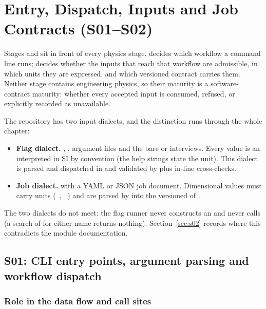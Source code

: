 \chapter{Entry, Dispatch, Inputs and Job Contracts (S01--S02)}\label{ch:s01-s02}

Stages  and  sit in front of every physics stage.  decides which workflow a command line runs;  decides whether the inputs that reach that workflow are admissible, in which units they are expressed, and which versioned contract carries them. Neither stage contains engineering physics, so their maturity is a software-contract maturity: whether every accepted input is consumed, refused, or explicitly recorded as unavailable.

The repository has two input dialects, and the distinction runs through the whole chapter:
\begin{itemize}
  \item \textbf{Flag dialect.}  \code{[flags]},  \code{[flags]},  argument files and the bare or  interviews. Every value is an   interpreted in SI by convention (the help strings state the unit). This dialect is parsed and dispatched in  and validated by  plus in-line cross-checks.
  \item \textbf{Job dialect.}   with a YAML or JSON job document. Dimensional values must carry units (~, ~) and are parsed by  into the versioned  of .
\end{itemize}
The two dialects do not meet: the flag runner never constructs an  and never calls  (a search of  for either name returns nothing). Section~\ref{sec:s02} records where this contradicts the module documentation.

\section{S01: CLI entry points, argument parsing and workflow dispatch}\label{sec:s01}

\subsection{Role in the data flow and call sites}\label{sec:s01-role}

